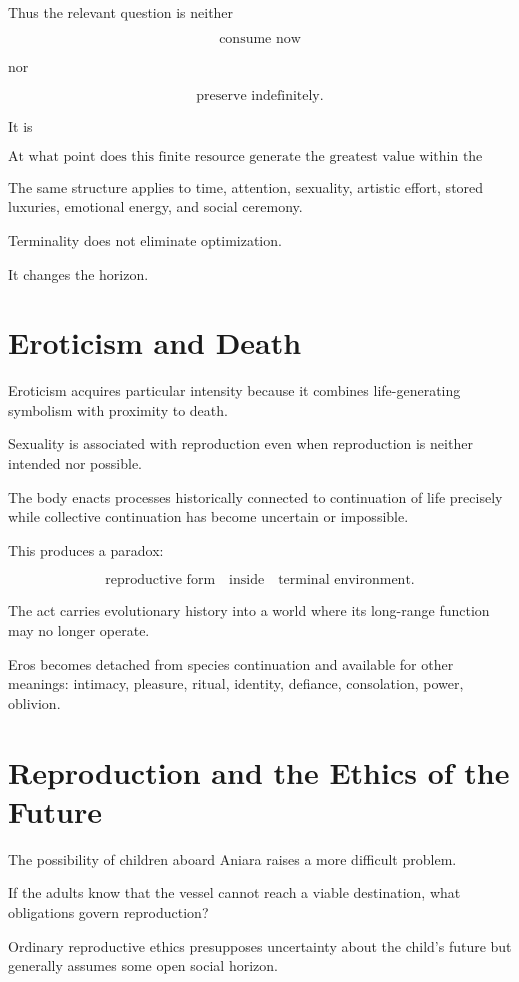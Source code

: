 \documentclass[11pt,oneside]{book}
\theoremstyle{definition}
\theoremstyle{remark}
\begin{document}
Thus the relevant question is neither

\[
\text{consume now}
\]

nor

\[
\text{preserve indefinitely}.
\]

It is

\[
\text{At what point does this finite resource generate the greatest value within the reachable future?}
\]

The same structure applies to time, attention, sexuality, artistic effort, stored luxuries, emotional energy, and social ceremony.

Terminality does not eliminate optimization.

It changes the horizon.

\section{Eroticism and Death}

Eroticism acquires particular intensity because it combines life-generating symbolism with proximity to death.

Sexuality is associated with reproduction even when reproduction is neither intended nor possible.

The body enacts processes historically connected to continuation of life precisely while collective continuation has become uncertain or impossible.

This produces a paradox:

\[
\text{reproductive form}
\quad\text{inside}\quad
\text{terminal environment}.
\]

The act carries evolutionary history into a world where its long-range function may no longer operate.

Eros becomes detached from species continuation and available for other meanings: intimacy, pleasure, ritual, identity, defiance, consolation, power, oblivion.

\section{Reproduction and the Ethics of the Future}

The possibility of children aboard Aniara raises a more difficult problem.

If the adults know that the vessel cannot reach a viable destination, what obligations govern reproduction?

Ordinary reproductive ethics presupposes uncertainty about the child's future but generally assumes some open social horizon.
\end{document}

